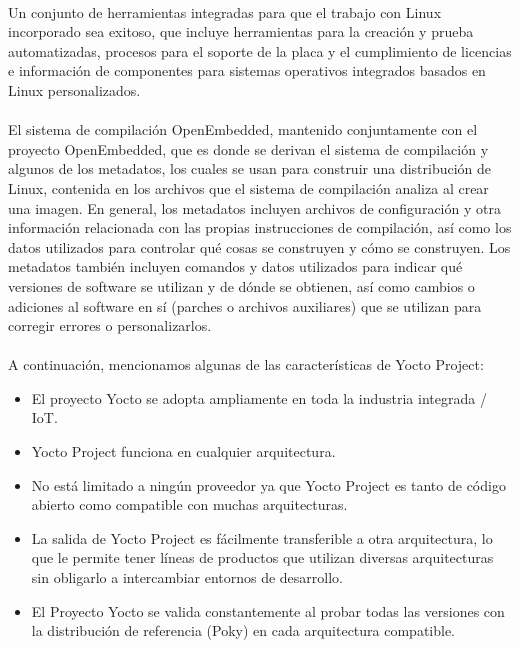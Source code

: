 \paragraph{}
Un conjunto de herramientas integradas para que el trabajo con Linux incorporado sea exitoso, que incluye herramientas para la creación y prueba automatizadas, procesos para el soporte de la placa y el cumplimiento de licencias e información de componentes para sistemas operativos integrados basados en Linux personalizados.
\paragraph{}
El sistema de compilación OpenEmbedded, mantenido conjuntamente con el proyecto OpenEmbedded, que es donde se derivan el sistema de compilación y algunos de los metadatos, los cuales se usan para construir una distribución de Linux, contenida en los archivos que el sistema de compilación analiza al crear una imagen. En general, los metadatos incluyen archivos de configuración y otra información relacionada con las propias instrucciones de compilación, así como los datos utilizados para controlar qué cosas se construyen y cómo se construyen. Los metadatos también incluyen comandos y datos utilizados para indicar qué versiones de software se utilizan y de dónde se obtienen, así como cambios o adiciones al software en sí (parches o archivos auxiliares) que se utilizan para corregir errores o personalizarlos.
\paragraph{}
A continuación, mencionamos algunas de las características de Yocto Project:
\begin{itemize}
	\item El proyecto Yocto se adopta ampliamente en toda la industria integrada / IoT.
    \item Yocto Project funciona en cualquier arquitectura.
    \item No está limitado a ningún proveedor ya que Yocto Project es tanto de código abierto como compatible con muchas arquitecturas.
    \item La salida de Yocto Project es fácilmente transferible a otra arquitectura, lo que le permite tener líneas de productos que utilizan diversas arquitecturas sin obligarlo a intercambiar entornos de desarrollo.
    \item El Proyecto Yocto se valida constantemente al probar todas las versiones con la distribución de referencia (Poky) en cada arquitectura compatible.
\end{itemize}
